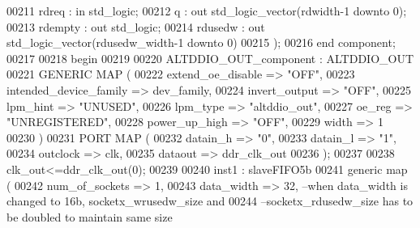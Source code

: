 \begin{DoxyCode}
00211       rdreq         : \textcolor{keywordflow}{in} \textcolor{comment}{std\_logic};
00212       q             : \textcolor{keywordflow}{out} \textcolor{comment}{std\_logic\_vector}(rdwidth\textcolor{vhdlchar}{-}\textcolor{vhdllogic}{}\textcolor{vhdllogic}{1} \textcolor{keywordflow}{downto} \textcolor{vhdllogic}{}\textcolor{vhdllogic}{0});
00213       rdempty       : \textcolor{keywordflow}{out} \textcolor{comment}{std\_logic};
00214       rdusedw       : \textcolor{keywordflow}{out} \textcolor{comment}{std\_logic\_vector}(rdusedw_width\textcolor{vhdlchar}{-}\textcolor{vhdllogic}{}\textcolor{vhdllogic}{1} \textcolor{keywordflow}{downto} \textcolor{vhdllogic}{}\textcolor{vhdllogic}{0})     
00215         );
00216 \textcolor{keywordflow}{end} \textcolor{keywordflow}{component};
00217 
00218 \textcolor{vhdlkeyword}{begin}
00219     
00220     ALTDDIO\_OUT\_component : ALTDDIO\_OUT
00221     \textcolor{keywordflow}{GENERIC} \textcolor{keywordflow}{MAP} (
00222         extend\_oe\_disable       => \textcolor{keyword}{"OFF"},
00223         intended\_device\_family  => dev_family,
00224         invert\_output               => \textcolor{keyword}{"OFF"},
00225         lpm\_hint                    => \textcolor{keyword}{"UNUSED"},
00226         lpm\_type                    => \textcolor{keyword}{"altddio\_out"},
00227         oe\_reg                      => \textcolor{keyword}{"UNREGISTERED"},
00228         power\_up\_high               => \textcolor{keyword}{"OFF"},
00229         width                       => \textcolor{vhdllogic}{1}
00230     \textcolor{vhdlchar}{)}
00231     \textcolor{keywordflow}{PORT} \textcolor{keywordflow}{MAP} (
00232         datain\_h => "\textcolor{vhdllogic}{0}",
00233         datain\_l => "\textcolor{vhdllogic}{1}",
00234         outclock => clk,
00235         dataout     => ddr_clk_out
00236     \textcolor{vhdlchar}{)};
00237     
00238 \textcolor{vhdlchar}{clk_out}\textcolor{vhdlchar}{<=}\textcolor{vhdlchar}{ddr_clk_out}\textcolor{vhdlchar}{(}\textcolor{vhdllogic}{}\textcolor{vhdllogic}{0}\textcolor{vhdlchar}{)};    
00239     
00240 inst1 : slaveFIFO5b 
00241     \textcolor{keywordflow}{generic} \textcolor{keywordflow}{map} (
00242                 num_of_sockets      => \textcolor{vhdllogic}{1},
00243                 data_width              => \textcolor{vhdllogic}{32},\textcolor{keyword}{                          --when data\_width is changed to
       16b, socketx\_wrusedw\_size and }
00244 \textcolor{keyword}{                                                                                --socketx\_rdusedw\_size has
       to be doubled to maintain same size}

\end{DoxyCode}
